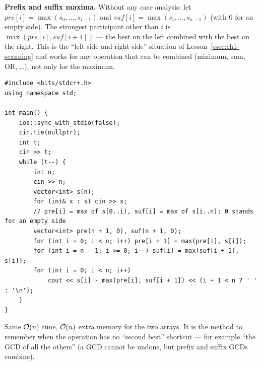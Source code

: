 \begin{alternativebox}
\textbf{Prefix and suffix maxima.} Without any case analysis: let $\mathit{pre}[i] = \max(s_0, \dots, s_{i-1})$ and $\mathit{suf}[i] = \max(s_i, \dots, s_{n-1})$ (with $0$ for an empty side). The strongest participant other than $i$ is $\max(\mathit{pre}[i], \mathit{suf}[i+1])$ --- the best on the left combined with the best on the right. This is the ``left side and right side'' situation of Lesson~\ref{ssec:ch1-scanning} and works for any operation that can be combined (minimum, sum, OR, \ldots), not only for the maximum.
\begin{lstlisting}[style=cpp]
#include <bits/stdc++.h>
using namespace std;

int main() {
    ios::sync_with_stdio(false);
    cin.tie(nullptr);
    int t;
    cin >> t;
    while (t--) {
        int n;
        cin >> n;
        vector<int> s(n);
        for (int& x : s) cin >> x;
        // pre[i] = max of s[0..i), suf[i] = max of s[i..n); 0 stands for an empty side
        vector<int> pre(n + 1, 0), suf(n + 1, 0);
        for (int i = 0; i < n; i++) pre[i + 1] = max(pre[i], s[i]);
        for (int i = n - 1; i >= 0; i--) suf[i] = max(suf[i + 1], s[i]);
        for (int i = 0; i < n; i++)
            cout << s[i] - max(pre[i], suf[i + 1]) << (i + 1 < n ? ' ' : '\n');
    }
}
\end{lstlisting}
Same $\mathcal{O}(n)$ time, $\mathcal{O}(n)$ extra memory for the two arrays. It is the method to remember when the operation has no ``second best'' shortcut --- for example ``the GCD of all the others'' (a GCD cannot be undone, but prefix and suffix GCDs combine).

\begin{diagrambox}
\end{diagrambox}
\end{alternativebox}

